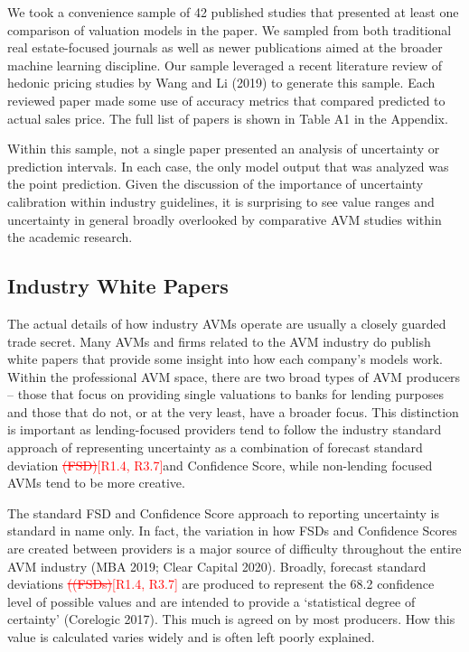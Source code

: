 \documentclass[colTwo]{anon}
\theoremstyle{definition}
\begin{document}
We took a convenience sample of 42 published studies that presented at least one comparison of valuation models in the paper. We sampled from both traditional real estate-focused journals as well as newer publications aimed at the broader machine learning discipline. Our sample leveraged a recent literature review of hedonic pricing studies by Wang and Li (2019) to generate this sample.  Each reviewed paper made some use of accuracy metrics that compared predicted to actual sales price.  The full list of papers is shown in Table A1 in the Appendix. 

Within this sample, not a single paper presented an analysis of uncertainty or prediction intervals. In each case, the only model output that was analyzed was the point prediction.  Given the discussion of the importance of uncertainty calibration within industry guidelines, it is surprising to see value ranges and uncertainty in general broadly overlooked by comparative AVM studies within the academic research.  

\subsection{Industry White Papers}

The actual details of how industry AVMs operate are usually a closely guarded trade secret. Many AVMs and firms related to the AVM industry do publish white papers that provide some insight into how each company’s models work.   Within the professional AVM space, there are two broad types of AVM producers -- those that focus on providing single valuations to banks for lending purposes and those that do not, or at the very least, have a broader focus.  This distinction is important as lending-focused providers tend to follow the industry standard approach of representing uncertainty as a combination of forecast standard deviation \textcolor{red}{\st{(FSD)}[R1.4, R3.7]}and Confidence Score, while non-lending focused AVMs tend to be more creative.

The standard FSD and Confidence Score approach to reporting uncertainty is standard in name only. In fact, the variation in how FSDs and Confidence Scores are created between providers is a major source of difficulty throughout the entire AVM industry (MBA 2019; Clear Capital 2020).     Broadly, forecast standard deviations \textcolor{red}{\st{((FSDs)}[R1.4, R3.7]} are produced to represent the 68.2 confidence level of possible values and are intended to provide a ‘statistical degree of certainty’ (Corelogic 2017).  This much is agreed on by most producers.  How this value is calculated varies widely and is often left poorly explained.  
\end{document}
